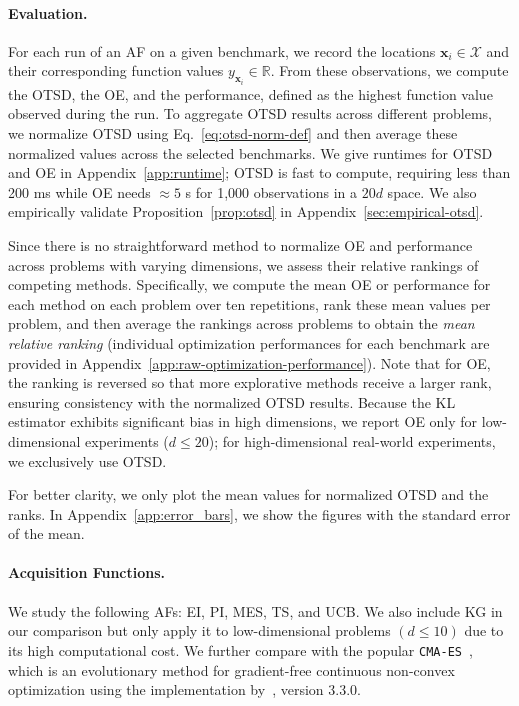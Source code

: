 \documentclass[accepted]{uai2025}
\begin{document}
\paragraph{Evaluation.} 
For each run of an \ac{AF} on a given benchmark, we record the locations $\bm{x}_i \in \mathcal{X}$ and their corresponding function values $y_{\bm{x}_i} \in \mathbb{R}$. 
From these observations, we compute the \ac{OTSD}, the \ac{OE}, and the performance, defined as the highest function value observed during the run. To aggregate OTSD results across different problems, we normalize OTSD using Eq.~\eqref{eq:otsd-norm-def} and then average these normalized values across the selected benchmarks. 
We give runtimes for \ac{OTSD} and \ac{OE} in Appendix~\ref{app:runtime}; \ac{OTSD} is fast to compute, requiring less than 200 ms while \ac{OE} needs $\approx 5$ s for 1,000 observations in a $20d$ space.
We also empirically validate Proposition~\ref{prop:otsd} in Appendix~\ref{sec:empirical-otsd}.

Since there is no straightforward method to normalize \ac{OE} and performance across problems with varying dimensions, we assess their relative rankings of competing methods. Specifically, we compute the mean \ac{OE} or performance for each method on each problem over ten repetitions, rank these mean values per problem, and then average the rankings across problems to obtain the \emph{mean relative ranking} (individual optimization performances for each benchmark are provided in Appendix~\ref{app:raw-optimization-performance}). Note that for \ac{OE}, the ranking is reversed so that more explorative methods receive a larger rank, ensuring consistency with the normalized \ac{OTSD} results.
Because the \ac{KL} estimator exhibits significant bias in high dimensions, we report \ac{OE} only for low-dimensional experiments ($d \leq 20$); for high-dimensional real-world experiments, we exclusively use \ac{OTSD}.

For better clarity, we only plot the mean values for normalized OTSD and the ranks.
In Appendix~\ref{app:error_bars}, we show the figures with the standard error of the mean.

\paragraph{Acquisition Functions.}
We study the following \acp{AF}: \acf{EI}, \acf{PI}, \acf{MES}, \acf{TS}, and \acf{UCB}.
We also include \acf{KG} in our comparison but only apply it to low-dimensional problems $(d\leq 10)$ due to its high computational cost.
We further compare with the popular \texttt{CMA-ES}~\citep{hansen2016cma}, which is an evolutionary method for gradient-free continuous non-convex optimization using the implementation by~\citet{hansen2019pycma}, version 3.3.0.
 
\end{document}
